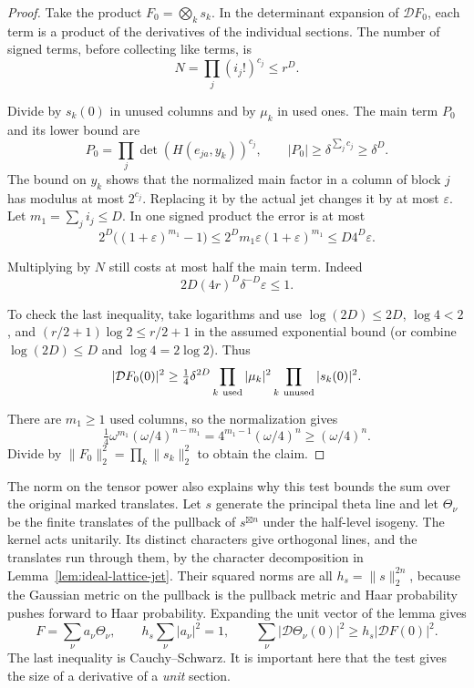\begin{proof}
Take the product \(F_0=\bigotimes_k s_k\). In the determinant expansion
of \(\mathcal D F_0\), each term is a product of the derivatives of the
individual sections. The number of signed terms, before collecting
like terms, is
\[
 N=\prod_j(i_j!)^{c_j}\le r^D .
\]

Divide by \(s_k(0)\) in unused columns and by \(\mu_k\) in used ones.
The main term \(P_0\) and its lower bound are
\[
 P_0=\prod_j\det(H(e_{ja},y_k))^{c_j},\qquad
 |P_0|\ge\delta^{\sum_jc_j}\ge\delta^D .
\]
The bound on \(y_k\) shows that the normalized main factor in a column
of block \(j\) has modulus at most \(2^{c_j}\). Replacing it by the
actual jet changes it by at most \(\varepsilon\).
Let \(m_1=\sum_j i_j\le D\). In one signed product the error is at most
\[
 2^D\big((1+\varepsilon)^{m_1}-1\big)
       \le 2^D m_1\varepsilon(1+\varepsilon)^{m_1}
       \le D4^D\varepsilon .
\]

Multiplying by \(N\) still costs at most half the main term. Indeed
\[
 2D(4r)^D\delta^{-D}\varepsilon\le1.
\]

To check the last inequality, take logarithms and use
\(\log(2D)\le2D\), \(\log4<2\), and
\((r/2+1)\log2\le r/2+1\) in the assumed exponential bound
(or combine \(\log(2D)\le D\) and \(\log 4=2\log 2\)).
Thus
\[
 |\mathcal D F_0(0)|^2\ge
 \tfrac14\delta^{2D}
   \prod_{k\ {\rm used}}|\mu_k|^2
   \prod_{k\ {\rm unused}}|s_k(0)|^2 .
\]

There are \(m_1\ge1\) used columns, so the normalization gives
\[
 \tfrac14\omega^{m_1}(\omega/4)^{n-m_1}
       =4^{m_1-1}(\omega/4)^n\ge(\omega/4)^n .
\] Divide by
\(\|F_0\|_2^2=\prod_k\|s_k\|_2^2\) to obtain the claim.
\end{proof}

The norm on the tensor power also explains why this test bounds the
sum over the original marked translates. Let \(s\) generate the
principal theta line and let \(\Theta_\nu\) be the finite translates
of the pullback of \(s^{\boxtimes n}\) under the half-level isogeny.
The kernel acts unitarily. Its distinct characters give orthogonal
lines, and the translates run through them, by the character
decomposition in Lemma~\ref{lem:ideal-lattice-jet}. Their squared
norms are all \(h_s=\|s\|_2^{2n}\), because the Gaussian metric on the
pullback is the pullback metric and Haar probability pushes forward
to Haar probability. Expanding the unit vector of the lemma gives
\[
 F=\sum_\nu a_\nu\Theta_\nu,\qquad
 h_s\sum_\nu|a_\nu|^2=1,\qquad
 \sum_\nu|\mathcal D\Theta_\nu(0)|^2
       \ge h_s|\mathcal D F(0)|^2 .
\]
The last inequality is Cauchy--Schwarz. It is important here that the
test gives the size of a derivative of a \emph{unit} section.

